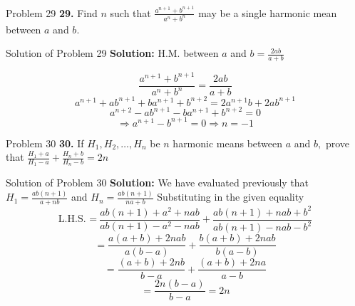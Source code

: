 \documentclass[aspectratio=1610,8pt]{beamer}
\begin{document}
\begin{frame}{Problem 29}
  \textbf{29.} Find $n$ such that $\frac{a^{n + 1} + b^{n + 1}}{a^n + b^n}$ may
  be a single harmonic mean between $a$ and $b.$
\end{frame}
\begin{frame}{Solution of Problem 29}
  \textbf{Solution:} H.M. between $a$ and $b = \frac{2ab}{a + b}$

  $$\frac{a^{n + 1} + b^{n + 1}}{a^n + b^n} = \frac{2ab}{a + b}$$
  $$a^{n + 1} + ab^{n + 1} + ba^{n + 1} + b^{n+ 2} = 2a^{n + 1}b + 2ab^{n +
    1}$$
  $$a^{n + 2} - ab^{n + 1} - ba^{n + 1} + b^{n + 2} = 0$$
  $$\Rightarrow a^{n + 1} - b^{n + 1} = 0 \Rightarrow n = -1$$
\end{frame}
\begin{frame}{Problem 30}
  \textbf{30.} If $H_1, H_2, \ldots, H_n$ be $n$ harmonic means between $a$ and
  $b,$ prove that $\frac{H_1 + a}{H_1 - a} + \frac{H_n + b}{H_n - b} = 2n$
\end{frame}
\begin{frame}{Solution of Problem 30}
  \textbf{Solution:} We have evaluated previously that $H_1 = \frac{ab(n +
    1)}{a + nb}$ and $H_n = \frac{ab(n + 1)}{na + b}$
  Substituting in the given equality
  $$\text{L.H.S. =}~\frac{ab(n + 1) + a^2 + nab}{ab(n + 1) - a^2 - nab} + \frac{ab(n + 1) + nab + b^2}{ab(n + 1) - nab - b^2}$$
  $$=\frac{a(a + b) + 2nab}{a(b - a)} + \frac{b(a + b) + 2nab}{b(a - b)}$$
  $$= \frac{(a + b) + 2nb}{b - a} + \frac{(a + b) + 2na}{a - b}$$
  $$=\frac{2n(b - a)}{b - a} = 2n$$
\end{frame}
\end{document}
